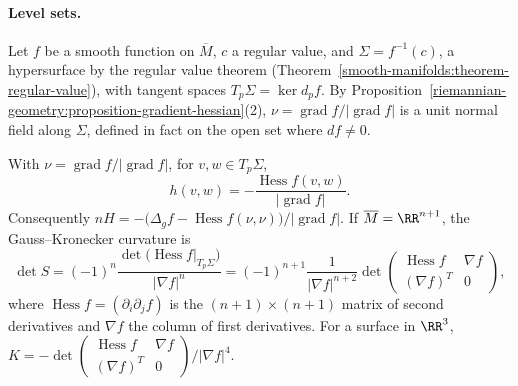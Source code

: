 \paragraph{Level sets.} Let $f$ be a smooth function on $\overline{M}$, $c$ a regular value, and $\Sigma = f^{-1}(c)$, a hypersurface by the regular value theorem
(Theorem~\ref{smooth-manifolds:theorem-regular-value}), with tangent spaces $T_p\Sigma = \ker d_pf$. By Proposition~\ref{riemannian-geometry:proposition-gradient-hessian}(2), $\nu = \operatorname{grad}f/|\operatorname{grad}f|$ is a
unit normal field along $\Sigma$, defined in fact on the open set where $df \neq 0$.

\begin{proposition}\label{riemannian-geometry:proposition-level-set-second-fundamental-form}
With $\nu = \operatorname{grad}f/|\operatorname{grad}f|$, for $v, w \in T_p\Sigma$,
\[
h(v, w) = -\frac{\operatorname{Hess}f(v, w)}{|\operatorname{grad}f|} .
\]
Consequently $n H = -\bigl(\Delta_gf - \operatorname{Hess}f(\nu, \nu)\bigr)/|\operatorname{grad}f|$. If $\overline{M} = \RR^{n+1}$, the Gauss--Kronecker curvature is
\[
\det S = (-1)^n\frac{\det\bigl(\operatorname{Hess}f|_{T_p\Sigma}\bigr)}{|\nabla f|^n} = (-1)^{n+1}\frac{1}{|\nabla f|^{n+2}}\det\begin{pmatrix}\operatorname{Hess}f & \nabla f\\ (\nabla f)^T & 0\end{pmatrix},
\]
where $\operatorname{Hess}f = (\partial_i\partial_jf)$ is the $(n+1) \times (n+1)$ matrix of second derivatives and $\nabla f$ the column of first derivatives. For a surface in $\RR^3$, $K = -\det\begin{pmatrix}\operatorname{Hess}f & \nabla f\\ (\nabla f)^T & 0\end{pmatrix}/|\nabla f|^4$.
\end{proposition}

